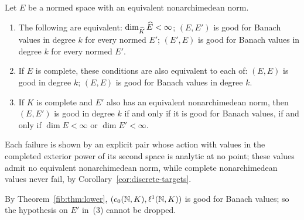 \begin{theorem}\label{fib:thm:local}
Let $E$ be a normed space with an equivalent nonarchimedean norm.
\begin{enumerate}
\item The following are equivalent: $\dim_{\widehat K}\widehat E<\infty$; $(E,E')$ is good for Banach values in degree $k$ for every normed
$E'$; $(E',E)$ is good for Banach values in degree $k$ for every normed $E'$.
\item If $E$ is complete, these conditions are also equivalent to each of: $(E,E)$ is good in degree $k$; $(E,E)$ is
good for Banach values in degree $k$.
\item If $K$ is complete and $E'$ also has an equivalent nonarchimedean norm, then $(E,E')$ is good in degree $k$ if and
only if it is good for Banach values, if and only if $\dim E<\infty$ or $\dim E'<\infty$.
\end{enumerate}
Each failure is shown by an explicit pair whose action with values in the completed exterior power of its second space
is analytic at no point; these values admit no equivalent nonarchimedean norm, while complete nonarchimedean values
never fail, by Corollary~\ref{cor:discrete-targets}.
\end{theorem}

By Theorem~\ref{fib:thm:lower}, $(c_0(\mathbb N,K),\ell^1(\mathbb N,K))$ is good for Banach values; so the hypothesis on $E'$ in~(3)
cannot be dropped.

